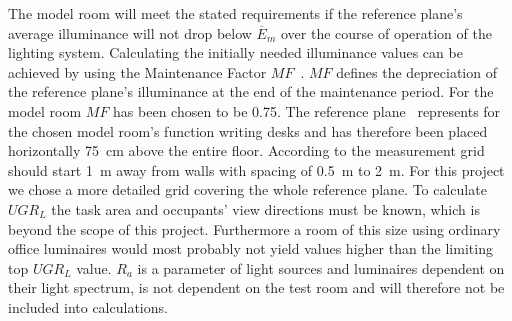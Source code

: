 The model room will meet the stated requirements if the reference plane's average illuminance will not drop below $\overline{E}_{m}$ over the course of operation of the lighting system. Calculating the initially needed illuminance values can be achieved by using the Maintenance Factor $MF$~\cite{CIE97}. $MF$ defines the depreciation of the reference plane's illuminance at the end of the maintenance period. For the model room $MF$ has been chosen to be 0.75. The reference plane~\cite{12464} represents for the chosen model room's function writing desks and has therefore been placed horizontally 75~cm above the entire floor. According to \cite{360011} the measurement grid should start 1~m away from walls with spacing of 0.5~m to 2~m. For this project we chose a more detailed grid covering the whole reference plane. To calculate $UGR_{L}$ the task area and occupants' view directions must be known, which is beyond the scope of this project. Furthermore a room of this size using ordinary office luminaires would most probably not yield values higher than the limiting top $UGR_{L}$ value. $R_{a}$ is a parameter of light sources and luminaires dependent on their light spectrum, is not dependent on the test room and will therefore not be included into calculations.